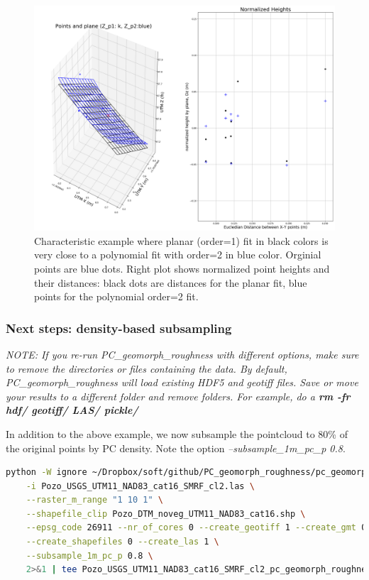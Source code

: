 \documentclass[a4paperpaper,,tablecaptionabove]{scrartcl}
\begin{document}
\begin{figure}
\centering
\includegraphics[width=\textwidth,height=0.9\textheight]{./tex2pdf.-e6884bf2dada0f3b/b096a2b8e56eebc80f4b8556f702600ef12f3085.png}
\caption{Characteristic example where planar (order=1) fit in black
colors is very close to a polynomial fit with order=2 in blue color.
Orginial points are blue dots. Right plot shows normalized point heights
and their distances: black dots are distances for the planar fit, blue
points for the polynomial order=2 fit.\label{Fig:PlaneFit_seed00020901}}
\end{figure}

\hypertarget{next-steps-density-based-subsampling}{%
\subsubsection{Next steps: density-based
subsampling}\label{next-steps-density-based-subsampling}}

\emph{NOTE: If you re-run PC\_geomorph\_roughness with different
options, make sure to remove the directories or files containing the
data. By default, PC\_geomorph\_roughness will load existing HDF5 and
geotiff files. Save or move your results to a different folder and
remove folders. For example, do a \textbf{rm -fr hdf/ geotiff/ LAS/
pickle/} }

In addition to the above example, we now subsample the pointcloud to
80\% of the original points by PC density. Note the option
\emph{--subsample\_1m\_pc\_p 0.8}.

\begin{lstlisting}[language=bash]
python -W ignore ~/Dropbox/soft/github/PC_geomorph_roughness/pc_geomorph_roughness.py \
    -i Pozo_USGS_UTM11_NAD83_cat16_SMRF_cl2.las \
    --raster_m_range "1 10 1" \
    --shapefile_clip Pozo_DTM_noveg_UTM11_NAD83_cat16.shp \
    --epsg_code 26911 --nr_of_cores 0 --create_geotiff 1 --create_gmt 0  \
    --create_shapefiles 0 --create_las 1 \
    --subsample_1m_pc_p 0.8 \
    2>&1 | tee Pozo_USGS_UTM11_NAD83_cat16_SMRF_cl2_pc_geomorph_roughness_subsample_p08_1_10_1.log
\end{lstlisting}
\end{document}
